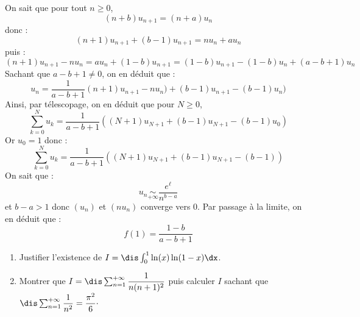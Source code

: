 \documentclass[a4paper,10pt]{report}
\begin{document}
\begin{corr}
\begin{enumerate}
\medskip

\noindent On sait que pour tout $n \geq 0$,
$$ (n+b) u_{n+1} = (n+a) u_n$$
donc :
$$ (n+1) u_{n+1} + (b-1) u_{n+1} = n u_n + au_n $$
puis :
$$ (n+1) u_{n+1}- n u_n = a u_n + (1-b) u_{n+1} = (1-b) u_{n+1} - (1-b) u_n +  (a-b+1) u_n$$
Sachant que $a-b+1 \neq 0$, on en déduit que :
$$ u_n = \dfrac{1}{a-b+1} (n+1) u_{n+1}- n u_n ) + (b-1) u_{n+1} - (b-1) u_n)$$
Ainsi, par télescopage, on en déduit que pour $N \geq 0$,
$$ \sum_{k=0}^N u_k = \dfrac{1}{a-b+1}  ( (N+1) u_{N+1} +(b-1) u_{N+1} - (b-1)u_0 )$$
Or $u_0=1$ donc : 
$$  \sum_{k=0}^N u_k = \dfrac{1}{a-b+1}  ( (N+1) u_{N+1} +(b-1) u_{N+1} - (b-1))$$
On sait que :
$$ u_n \underset{+ \infty}{\sim} \dfrac{e^{\ell}}{n^{b-a}}$$
et $b-a>1$ donc $(u_n)$ et $(nu_n)$ converge vers $0$. Par passage à la limite, on en déduit que :
$$ f(1) = \dfrac{1-b}{a-b+1}$$
\end{enumerate}
\end{corr}

\begin{Exercice}{}
\begin{enumerate}
\item Justifier l'existence de $I= \dis \int_{0}^1 \ln(x) \ln(1-x) \dx$.
\item Montrer que $I =\dis \sum_{n=1}^{+ \infty} \dfrac{1}{n(n+1)^2}$ puis calculer $I$ sachant que $\dis \sum_{n=1}^{+ \infty} \dfrac{1}{n^2} = \dfrac{\pi^2}{6}\cdot$
\end{enumerate}
\end{Exercice}
\end{document}
